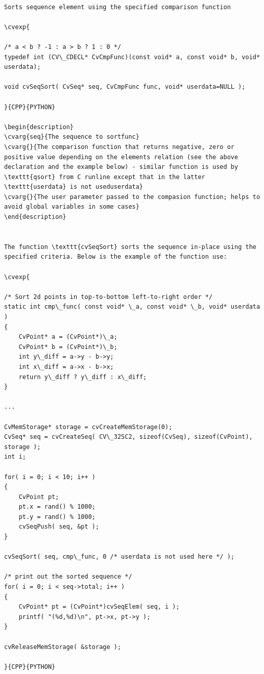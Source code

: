 \label{SeqSort}
\begin{verbatim}

Sorts sequence element using the specified comparison function

\cvexp{

/* a < b ? -1 : a > b ? 1 : 0 */
typedef int (CV\_CDECL* CvCmpFunc)(const void* a, const void* b, void* userdata);

void cvSeqSort( CvSeq* seq, CvCmpFunc func, void* userdata=NULL );

}{CPP}{PYTHON}

\begin{description}
\cvarg{seq}{The sequence to sortfunc}
\cvarg{}{The comparison function that returns negative, zero or positive value depending on the elements relation (see the above declaration and the example below) - similar function is used by \texttt{qsort} from C runline except that in the latter \texttt{userdata} is not useduserdata}
\cvarg{}{The user parameter passed to the compasion function; helps to avoid global variables in some cases}
\end{description}


The function \texttt{cvSeqSort} sorts the sequence in-place using the specified criteria. Below is the example of the function use:

\cvexp{

/* Sort 2d points in top-to-bottom left-to-right order */
static int cmp\_func( const void* \_a, const void* \_b, void* userdata )
{
    CvPoint* a = (CvPoint*)\_a;
    CvPoint* b = (CvPoint*)\_b;
    int y\_diff = a->y - b->y;
    int x\_diff = a->x - b->x;
    return y\_diff ? y\_diff : x\_diff;
}

...

CvMemStorage* storage = cvCreateMemStorage(0);
CvSeq* seq = cvCreateSeq( CV\_32SC2, sizeof(CvSeq), sizeof(CvPoint), storage );
int i;

for( i = 0; i < 10; i++ )
{
    CvPoint pt;
    pt.x = rand() % 1000;
    pt.y = rand() % 1000;
    cvSeqPush( seq, &pt );
}

cvSeqSort( seq, cmp\_func, 0 /* userdata is not used here */ );

/* print out the sorted sequence */
for( i = 0; i < seq->total; i++ )
{
    CvPoint* pt = (CvPoint*)cvSeqElem( seq, i );
    printf( "(%d,%d)\n", pt->x, pt->y );
}

cvReleaseMemStorage( &storage );

}{CPP}{PYTHON}


\end{verbatim}
